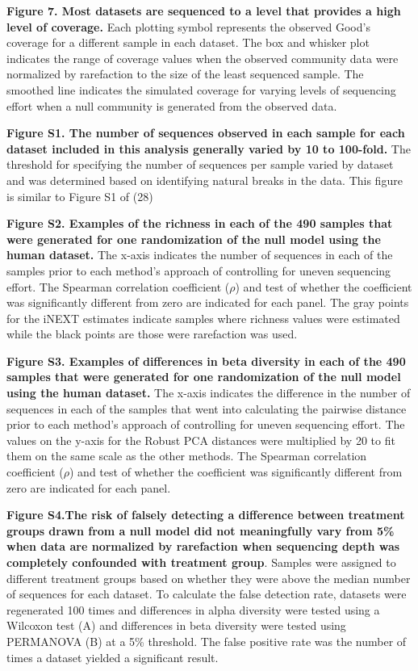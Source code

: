 \documentclass[
]{article}
\begin{document}
\textbf{Figure 7. Most datasets are sequenced to a level that provides a
high level of coverage.} Each plotting symbol represents the observed
Good's coverage for a different sample in each dataset. The box and
whisker plot indicates the range of coverage values when the observed
community data were normalized by rarefaction to the size of the least
sequenced sample. The smoothed line indicates the simulated coverage for
varying levels of sequencing effort when a null community is generated
from the observed data.

\newpage

\textbf{Figure S1. The number of sequences observed in each sample for
each dataset included in this analysis generally varied by 10 to
100-fold.} The threshold for specifying the number of sequences per
sample varied by dataset and was determined based on identifying natural
breaks in the data. This figure is similar to Figure S1 of (28)

\textbf{Figure S2. Examples of the richness in each of the 490 samples
that were generated for one randomization of the null model using the
human dataset.} The x-axis indicates the number of sequences in each of
the samples prior to each method's approach of controlling for uneven
sequencing effort. The Spearman correlation coefficient (\(\rho\)) and
test of whether the coefficient was significantly different from zero
are indicated for each panel. The gray points for the iNEXT estimates
indicate samples where richness values were estimated while the black
points are those were rarefaction was used.

\textbf{Figure S3. Examples of differences in beta diversity in each of
the 490 samples that were generated for one randomization of the null
model using the human dataset.} The x-axis indicates the difference in
the number of sequences in each of the samples that went into
calculating the pairwise distance prior to each method's approach of
controlling for uneven sequencing effort. The values on the y-axis for
the Robust PCA distances were multiplied by 20 to fit them on the same
scale as the other methods. The Spearman correlation coefficient
(\(\rho\)) and test of whether the coefficient was significantly
different from zero are indicated for each panel.

\textbf{Figure S4.The risk of falsely detecting a difference between
treatment groups drawn from a null model did not meaningfully vary from
5\% when data are normalized by rarefaction when sequencing depth was
completely confounded with treatment group}. Samples were assigned to
different treatment groups based on whether they were above the median
number of sequences for each dataset. To calculate the false detection
rate, datasets were regenerated 100 times and differences in alpha
diversity were tested using a Wilcoxon test (A) and differences in beta
diversity were tested using PERMANOVA (B) at a 5\% threshold. The false
positive rate was the number of times a dataset yielded a significant
result.
\end{document}
